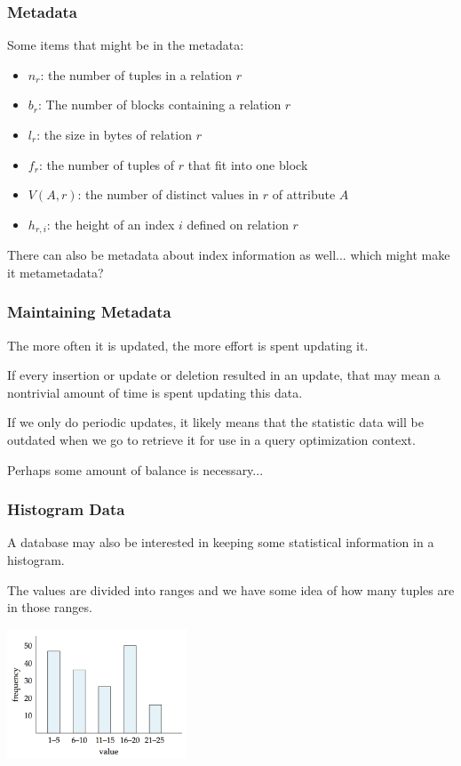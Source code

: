 \begin{frame}
\frametitle{Metadata}

Some items that might be in the metadata:

\begin{itemize}
	\item $n_{r}$: the number of tuples in a relation $r$ 
	\item $b_{r}$: The number of blocks containing a relation $r$ 
	\item $l_{r}$: the size in bytes of relation $r$
	\item $f_{r}$: the number of tuples of $r$ that fit into one block
	\item $V(A, r)$: the number of distinct values in $r$ of attribute $A$
	\item $h_{r, i}$: the height of an index $i$ defined on relation $r$
\end{itemize}

There can also be metadata about index information as well... which might make it metametadata?

\end{frame}



\begin{frame}
\frametitle{Maintaining Metadata}

The more often it is updated, the more effort is spent updating it. 

If every insertion or update or deletion resulted in an update, that may mean a nontrivial amount of time is spent updating this data. 

If we only do periodic updates, it likely means that the statistic data will be outdated when we go to retrieve it for use in a query optimization context. 

Perhaps some amount of balance is necessary...


\end{frame}

\begin{frame}
\frametitle{Histogram Data}

A database may also be interested in keeping some statistical information in a histogram. 

The values are divided into ranges and we have some idea of how many tuples are in those ranges. 

\begin{center}
\includegraphics[width=0.4\textwidth]{images/histogram}
\end{center}

\end{frame}

